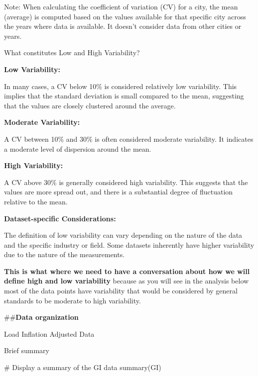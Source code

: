 \documentclass[
  letterpaper,
  DIV=11,
  numbers=noendperiod]{scrartcl}
\newenvironment{Shaded}{\begin{snugshade}}{\end{snugshade}}
\newcommand{\CommentTok}[1]{\textcolor[rgb]{0.37,0.37,0.37}{#1}}
\newcommand{\FunctionTok}[1]{\textcolor[rgb]{0.28,0.35,0.67}{#1}}
\newcommand{\NormalTok}[1]{\textcolor[rgb]{0.00,0.23,0.31}{#1}}
\begin{document}
Note: When calculating the coefficient of variation (CV) for a city, the
mean (average) is computed based on the values available for that
specific city across the years where data is available. It doesn't
consider data from other cities or years.

What constitutes Low and High Variability?

\textbf{Low Variability:}

In many cases, a CV below 10\% is considered relatively low variability.
This implies that the standard deviation is small compared to the mean,
suggesting that the values are closely clustered around the average.

\textbf{Moderate Variability:}

A CV between 10\% and 30\% is often considered moderate variability. It
indicates a moderate level of dispersion around the mean.

\textbf{High Variability:}

A CV above 30\% is generally considered high variability. This suggests
that the values are more spread out, and there is a substantial degree
of fluctuation relative to the mean.

\textbf{Dataset-specific Considerations:}

The definition of low variability can vary depending on the nature of
the data and the specific industry or field. Some datasets inherently
have higher variability due to the nature of the measurements.

\textbf{This is what where we need to have a conversation about how we
will define high and low variability} because as you will see in the
analysis below most of the data points have variability that would be
considered by general standards to be moderate to high variability.

\#\#\textbf{Data organization}

Load Inflation Adjusted Data

Brief summary

\begin{Shaded}
\begin{Highlighting}[]
\CommentTok{\# Display a summary of the GI data}
\FunctionTok{summary}\NormalTok{(GI)}
\end{Highlighting}
\end{Shaded}
\end{document}
